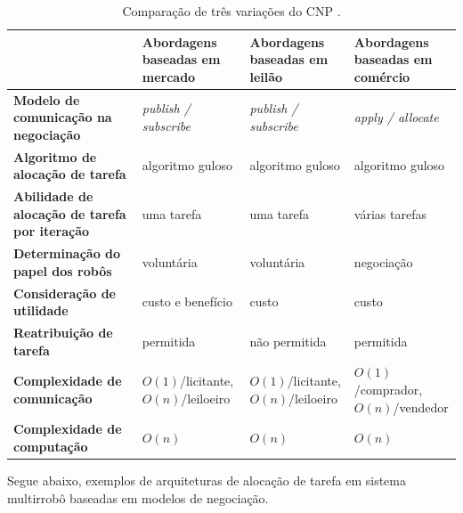                 \begin{table}[hbt]
                    \setlength\extrarowheight{4pt}
                    \centering
                    \caption[Comparação de três variações do CNP.]{Comparação de três variações do CNP \cite{ref:yan2013survey}.}
                    \label{tab:arquiteturas_cnp}
                    \begin{tabular}{>{\centering\bfseries}m{} >{\centering}m{} >{\centering}m{} >{\centering\arraybackslash}m{}}
                        \toprule
                         & \textbf{Abordagens baseadas em mercado} & \textbf{Abordagens baseadas em leilão} & \textbf{Abordagens baseadas em comércio} \\
                        \midrule
                        Modelo de comunicação na negociação & \textit{publish / subscribe} & \textit{publish / subscribe} & \textit{apply / allocate} \\
                        Algoritmo de alocação de tarefa & algoritmo guloso & algoritmo guloso & algoritmo guloso \\
                        Abilidade de alocação de tarefa por iteração & uma tarefa & uma tarefa & várias tarefas \\
                        Determinação do papel dos robôs & voluntária & voluntária & negociação \\
                        Consideração de utilidade & custo e benefício & custo & custo \\
                        Reatribuição de tarefa & permitida & não permitida & permitida \\
                        Complexidade de comunicação & $O(1)$/licitante, $O(n)$/leiloeiro & $O(1)$/licitante, $O(n)$/leiloeiro & $O(1)$/comprador, $O(n)$/vendedor \\
                        Complexidade de computação & $O(n)$ & $O(n)$ & $O(n)$ \\
                        \bottomrule
                    \end{tabular}
                \end{table}
                
                Segue abaixo, exemplos de arquiteturas de alocação de tarefa em sistema multirrobô baseadas em modelos de negociação.
    
